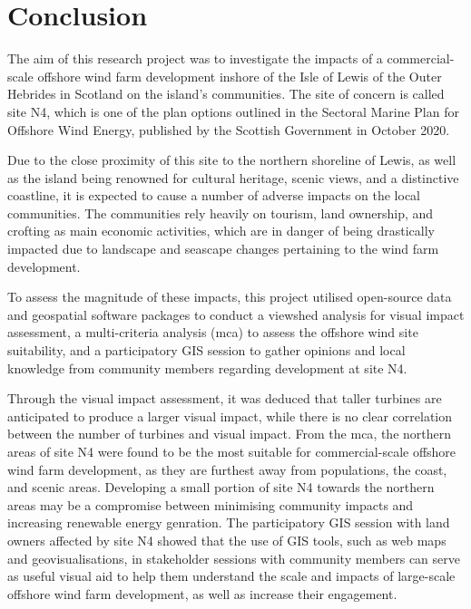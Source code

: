 \chapter{Conclusion}

The aim of this research project was to investigate the impacts of a commercial-scale offshore wind farm development inshore of the Isle of Lewis of the Outer Hebrides in Scotland on the island's communities. The site of concern is called site N4, which is one of the plan options outlined in the Sectoral Marine Plan for Offshore Wind Energy, published by the Scottish Government in October 2020.

Due to the close proximity of this site to the northern shoreline of Lewis, as well as the island being renowned for cultural heritage, scenic views, and a distinctive coastline, it is expected to cause a number of adverse impacts on the local communities. The communities rely heavily on tourism, land ownership, and crofting as main economic activities, which are in danger of being drastically impacted due to landscape and seascape changes pertaining to the wind farm development.

To assess the magnitude of these impacts, this project utilised open-source data and geospatial software packages to conduct a viewshed analysis for visual impact assessment, a multi-criteria analysis (\gls{mca}) to assess the offshore wind site suitability, and a participatory GIS session to gather opinions and local knowledge from community members regarding development at site N4.

Through the visual impact assessment, it was deduced that taller turbines are anticipated to produce a larger visual impact, while there is no clear correlation between the number of turbines and visual impact. From the \gls{mca}, the northern areas of site N4 were found to be the most suitable for commercial-scale offshore wind farm development, as they are furthest away from populations, the coast, and scenic areas. Developing a small portion of site N4 towards the northern areas may be a compromise between minimising community impacts and increasing renewable energy genration. The participatory GIS session with land owners affected by site N4 showed that the use of GIS tools, such as web maps and geovisualisations, in stakeholder sessions with community members can serve as useful visual aid to help them understand the scale and impacts of large-scale offshore wind farm development, as well as increase their engagement.
